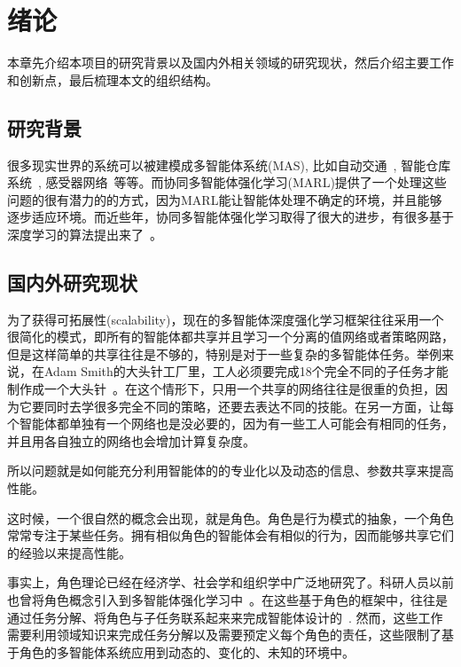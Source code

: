
\chapter{绪论}
本章先介绍本项目的研究背景以及国内外相关领域的研究现状，然后介绍主要工作和创新点，最后梳理本文的组织结构。

\section{研究背景}
很多现实世界的系统可以被建模成多智能体系统(MAS), 比如自动交通~\cite{cao2012overview}, 智能仓库系统~\cite{nowe2012game}, 感受器网络~\cite{zhang2011coordinated}等等。而协同多智能体强化学习(MARL)提供了一个处理这些问题的很有潜力的的方式，因为MARL能让智能体处理不确定的环境，并且能够逐步适应环境。而近些年，协同多智能体强化学习取得了很大的进步，有很多基于深度学习的算法提出来了~\cite{foerster2018counterfactual, sunehag2018value, rashid2018qmix, son2019qtran, vinyals2019grandmaster, wang2020learning, baker2020emergent}。

\section{国内外研究现状}
为了获得可拓展性(scalability)，现在的多智能体深度强化学习框架往往采用一个很简化的模式，即所有的智能体都共享并且学习一个分离的值网络或者策略网路，但是这样简单的共享往往是不够的，特别是对于一些复杂的多智能体任务。举例来说，在Adam Smith的大头针工厂里，工人必须要完成18个完全不同的子任务才能制作成一个大头针~\cite{smith1937wealth}。在这个情形下，只用一个共享的网络往往是很重的负担，因为它要同时去学很多完全不同的策略，还要去表达不同的技能。在另一方面，让每个智能体都单独有一个网络也是没必要的，因为有一些工人可能会有相同的任务，并且用各自独立的网络也会增加计算复杂度。

所以问题就是如何能充分利用智能体的的专业化以及动态的信息、参数共享来提高性能。

这时候，一个很自然的概念会出现，就是角色。角色是行为模式的抽象，一个角色常常专注于某些任务。拥有相似角色的智能体会有相似的行为，因而能够共享它们的经验以来提高性能。

事实上，角色理论已经在经济学、社会学和组织学中广泛地研究了。科研人员以前也曾将角色概念引入到多智能体强化学习中~\cite{becht1999rope, stone1999task, depke2001roles, ferber2003agents, odell2004metamodel, bonjean2014adelfe, Lhaksmana2018role}。在这些基于角色的框架中，往往是通过任务分解、将角色与子任务联系起来来完成智能体设计的~\cite{zhu2008role}. 然而，这些工作需要利用领域知识来完成任务分解以及需要预定义每个角色的责任，这些限制了基于角色的多智能体系统应用到动态的、变化的、未知的环境中。


